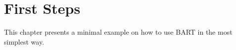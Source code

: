 \chapter{First Steps}

This chapter presents a minimal example on how to use BART in the most simplest way.
